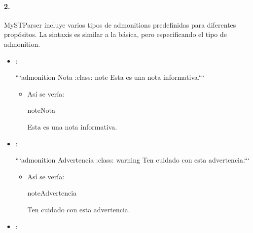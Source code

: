 \documentclass[a4paper,10pt,oneside,spanish,openany]{sphinxmanual}
\begin{document}
\paragraph{2. }
\label{\detokenize{configuracion_inicial/013.guia_de_myst_parser:tipos-predefinidos-de-admonitions}}
\sphinxAtStartPar
MyST\sphinxhyphen{}Parser incluye varios tipos de admonitions predefinidas para diferentes propósitos. La sintaxis es similar a la básica, pero especificando el tipo de admonition.
\begin{itemize}
\item {} 
\sphinxAtStartPar
{}:

\begin{sphinxVerbatim}[commandchars=\\\{\}]
  ```\PYGZob{}admonition\PYGZcb{} Nota :class: note Esta es una nota informativa.```
\end{sphinxVerbatim}
\begin{itemize}
\item {} 
\sphinxAtStartPar
Así se vería:

\begin{sphinxadmonition}{note}{Nota}

\sphinxAtStartPar
Esta es una nota informativa.
\end{sphinxadmonition}

\end{itemize}

\item {} 
\sphinxAtStartPar
{}:

\begin{sphinxVerbatim}[commandchars=\\\{\}]
  ```\PYGZob{}admonition\PYGZcb{} Advertencia :class: warning Ten cuidado con esta advertencia.```
\end{sphinxVerbatim}
\begin{itemize}
\item {} 
\sphinxAtStartPar
Así se vería:

\begin{sphinxadmonition}{note}{Advertencia}

\sphinxAtStartPar
Ten cuidado con esta advertencia.
\end{sphinxadmonition}

\end{itemize}

\item {} 
\sphinxAtStartPar
{}:


\end{itemize}
\end{document}
